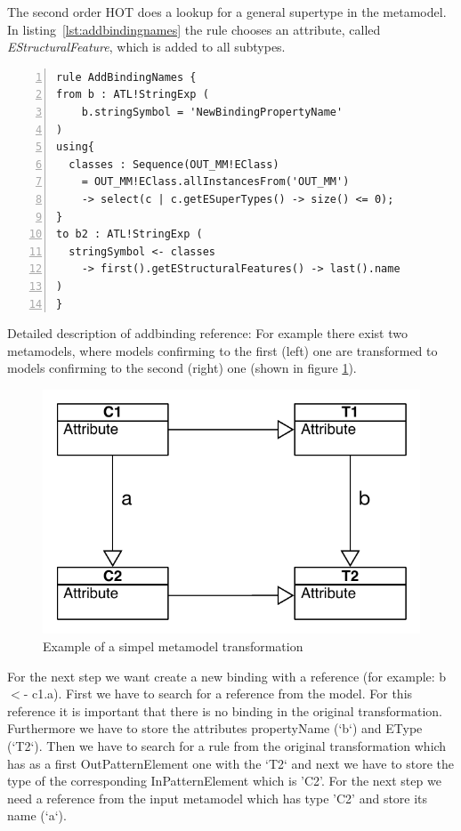 \documentclass{llncs}
\begin{document}
The second order HOT does a lookup for a general supertype in the metamodel. In listing~\ref{lst:addbindingnames} the rule chooses an attribute, called \emph{EStructuralFeature}, which is added to all subtypes.

\begin{lstlisting}[language=ATL, numbers=left,xleftmargin=5.0ex, caption=AddBindingNames-Definition., label=lst:addbindingnames]
rule AddBindingNames {
from b : ATL!StringExp (
    b.stringSymbol = 'NewBindingPropertyName'
)
using{
  classes : Sequence(OUT_MM!EClass) 
	= OUT_MM!EClass.allInstancesFrom('OUT_MM') 
	-> select(c | c.getESuperTypes() -> size() <= 0);
}
to b2 : ATL!StringExp ( 
  stringSymbol <- classes 
	-> first().getEStructuralFeatures() -> last().name
)	
}
\end{lstlisting}

Detailed description of addbinding reference:
For example there exist two metamodels, where models confirming to the first (left) one are transformed to models confirming to the second (right) one (shown in figure
\ref{fig:simple_metamodel}).

\begin{figure}
	\centering
	\includegraphics[angle=0,width=1\textwidth,natwidth=610,natheight=642]{figures/SimpleMM.pdf}
	\caption{Example of a simpel metamodel transformation}
	\label{fig:simple_metamodel}
\end{figure}

For the next step we want create a new binding with a reference (for example: b $<$- c1.a).
First we have to search for a reference from the model. For this reference it is
important that there is no binding in the original transformation. Furthermore
we have to store the attributes propertyName (`b`) and EType (`T2`). 
Then we have to search for a rule from the original transformation which
has as a first OutPatternElement one with the `T2` and next we have to store the type of the corresponding InPatternElement which is 'C2'.
For the next step we need a reference from the input metamodel which
has type 'C2' and store its name (`a`). \par
\end{document}
